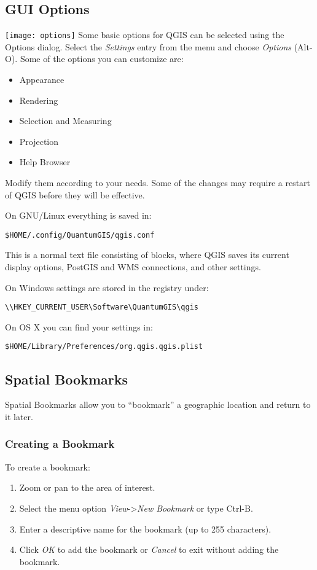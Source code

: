\subsection{GUI Options}
\label{subsec:gui_options}
\texttt{[image: options]} Some basic options for QGIS
can be selected using the Options dialog. Select the \textsl{Settings} entry
from the menu and choose \textsl{Options} (Alt-O). Some of the options you can customize are:
\begin{itemize}
\item Appearance
\item Rendering
\item Selection and Measuring
\item Projection
\item Help Browser
\end{itemize}
Modify them according to your needs. Some of the changes may require a restart of QGIS before they will be effective.

On GNU/Linux everything is saved in:
\begin{verbatim}
$HOME/.config/QuantumGIS/qgis.conf
\end{verbatim}
This is a normal text file consisting of blocks, where QGIS saves its current
display options, PostGIS and WMS connections, and other settings.

On Windows settings are stored in the registry under:
\begin{verbatim}
\\HKEY_CURRENT_USER\Software\QuantumGIS\qgis
\end{verbatim}

On OS X you can find your settings in:
\begin{verbatim}
$HOME/Library/Preferences/org.qgis.qgis.plist
\end{verbatim}


\subsection{Spatial Bookmarks}\label{sec:bookmarks}

Spatial Bookmarks allow you to ``bookmark'' a geographic location and return to it later.

\subsubsection{Creating a Bookmark}
To create a bookmark:
\begin{enumerate}
\item Zoom or pan to the area of interest.
\item Select the menu option \textit{View}->\textit{New Bookmark} or type Ctrl-B.
\item Enter a descriptive name for the bookmark (up to 255 characters).
\item Click \textit{OK} to add the bookmark or \textit{Cancel} to exit without adding the bookmark.
\end{enumerate}

